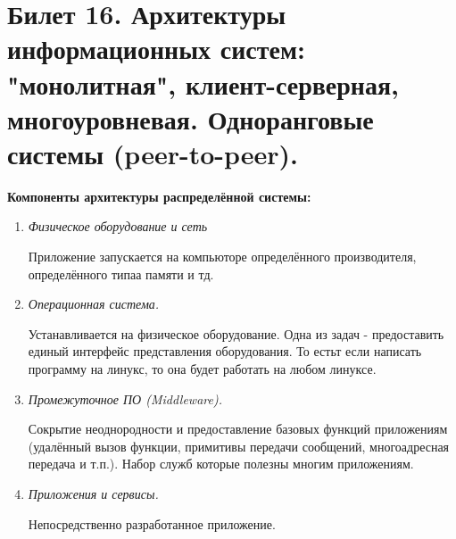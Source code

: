 \newpage
\section{Билет 16. Архитектуры информационных систем: "монолитная", клиент-серверная, многоуровневая. Одноранговые системы (peer-to-peer).}

\textbf{Компоненты архитектуры распределённой системы:}
\begin{enumerate}
\item \textit{Физическое оборудование и сеть}

Приложение запускается на компьюторе определённого производителя, определённого типаа памяти и тд.

\item \textit{Операционная система.}

Устанавливается на физическое оборудование. Одна из задач - предоставить единый интерфейс представления оборудования. То естьт если написать программу на линукс, то она будет работать на любом линуксе. 

\item \textit{Промежуточное ПО (Middleware).}

Сокрытие неоднородности и предоставление базовых функций приложениям (удалённый вызов функции, примитивы передачи сообщений, многоадресная передача и т.п.).
Набор служб которые полезны многим приложениям.

\item \textit{Приложения и сервисы.}

Непосредственно разработанное приложение.
\end{enumerate}

